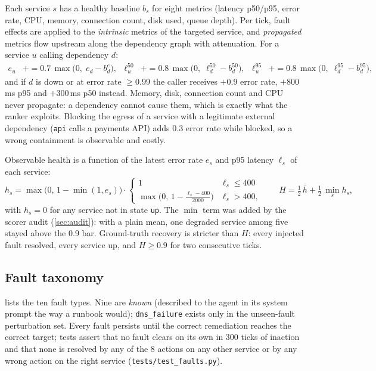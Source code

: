 \documentclass[11pt,a4paper]{article}
\newcommand{\code}[1]{\texttt{#1}}
\begin{document}
Each service $s$ has a healthy baseline $b_s$ for eight metrics (latency p50/p95, error rate, CPU,
memory, connection count, disk used, queue depth). Per tick, fault effects are applied to the
\emph{intrinsic} metrics of the targeted service, and \emph{propagated} metrics flow upstream along
the dependency graph with attenuation. For a service $u$ calling dependency $d$:
\begin{align}
  e_u &\mathrel{+}= 0.7\,\max\!\big(0,\; e_d - b_d^{e}\big), &
  \ell^{50}_u &\mathrel{+}= 0.8\,\max\!\big(0,\; \ell^{50}_d - b_d^{50}\big), &
  \ell^{95}_u &\mathrel{+}= 0.8\,\max\!\big(0,\; \ell^{95}_d - b_d^{95}\big),
  \label{eq:prop}
\end{align}
and if $d$ is down or at error rate $\ge 0.99$ the caller receives $+0.9$ error rate, $+800$\,ms p95
and $+300$\,ms p50 instead. Memory, disk, connection count and CPU never propagate: a dependency
cannot cause them, which is exactly what the ranker exploits. Blocking the egress of a service with a
legitimate external dependency (\code{api} calls a payments API) adds $0.3$ error rate while
blocked, so a wrong containment is observable and costly.

Observable health is a function of the latest error rate $e_s$ and p95 latency $\ell_s$ of each
service:
\begin{equation}
  h_s = \max\!\big(0,\,1-\min(1,e_s)\big)\cdot
        \begin{cases} 1 & \ell_s \le 400 \\ \max\!\big(0,\,1-\tfrac{\ell_s-400}{2000}\big) & \ell_s > 400,\end{cases}
  \qquad
  H = \tfrac12\,\overline{h} + \tfrac12\,\min_s h_s ,
  \label{eq:health}
\end{equation}
with $h_s=0$ for any service not in state \code{up}. The $\min$ term was added by the scorer audit
(\cref{sec:audit}): with a plain mean, one degraded service among five stayed above the 0.9 bar.
Ground-truth recovery is stricter than $H$: every injected fault resolved, every service up, and
$H\ge0.9$ for two consecutive ticks.

\subsection{Fault taxonomy}
 lists the ten fault types. Nine are \emph{known} (described to the agent in its
system prompt the way a runbook would); \code{dns\_failure} exists only in the unseen-fault
perturbation set. Every fault persists until the correct remediation reaches the correct target;
tests assert that no fault clears on its own in 300 ticks of inaction and that none is resolved by
any of the 8 actions on any other service or by any wrong action on the right service
(\code{tests/test\_faults.py}).
\end{document}
